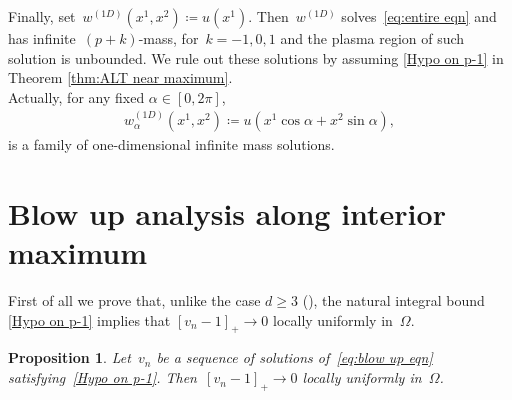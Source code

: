 \documentclass[10pt]{amsart}
\renewcommand{\to}{\rightarrow}
\newtheorem{proposition}[theorem]{Proposition}
\begin{document}
Finally, set~$w^{(1D)}(x^1, x^2)\coloneqq u(x^1)$.
Then~$w^{(1D)}$ solves~\eqref{eq:entire eqn} and has infinite~$(p+k)$-mass, for~$k=-1,0,1$ and
the plasma region of such solution is unbounded.
We rule out these solutions by assuming \eqref{Hypo on p-1} in Theorem \ref{thm:ALT near maximum}.\\
Actually, for any fixed $\alpha\in [0,2\pi]$,
\begin{align*}
    w^{(1D)}_{\alpha}(x^1,x^2)\coloneqq u(x^1\cos\alpha+x^2\sin\alpha),
\end{align*}
is a family of one-dimensional infinite mass solutions.


\bigskip


\section{Blow up analysis along interior maximum}\label{sect:blowup max}
First of all we prove that, unlike the case $d\geq 3$ (\cite{BJW}), the natural integral bound
\eqref{Hypo on p-1} implies that $[v_n-1]_+ \to 0$ locally uniformly in~$\Omega$.
    \begin{proposition}\label{prop:local vanishing}
        Let~$v_n$ be a sequence of solutions of~\eqref{eq:blow up eqn} satisfying~\eqref{Hypo on p-1}.
        Then~$[v_n-1]_+ \to 0$ locally uniformly in~$\Omega$.
    \end{proposition}
\end{document}
